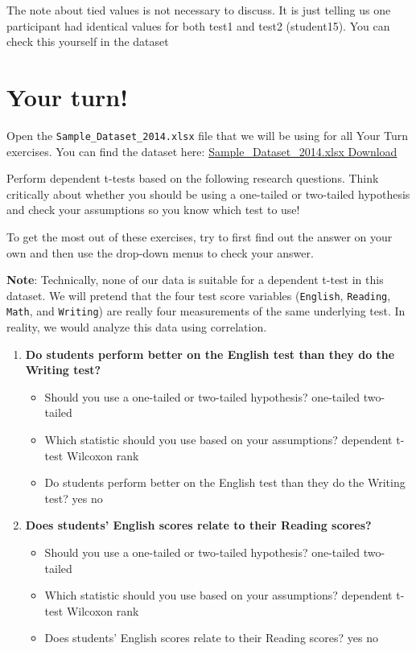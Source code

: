 \documentclass[
]{book}
\begin{document}
The note about tied values is not necessary to discuss. It is just telling us one participant had identical values for both test1 and test2 (student15). You can check this yourself in the dataset

\hypertarget{your-turn-1}{%
\section{Your turn!}\label{your-turn-1}}

Open the \texttt{Sample\_Dataset\_2014.xlsx} file that we will be using for all Your Turn exercises. You can find the dataset here: \href{https://github.com/danawanzer/stats-with-jamovi/blob/master/data/Sample_Dataset_2014.xlsx}{Sample\_Dataset\_2014.xlsx Download}

Perform dependent t-tests based on the following research questions. Think critically about whether you should be using a one-tailed or two-tailed hypothesis and check your assumptions so you know which test to use!

To get the most out of these exercises, try to first find out the answer on your own and then use the drop-down menus to check your answer.

\textbf{Note}: Technically, none of our data is suitable for a dependent t-test in this dataset. We will pretend that the four test score variables (\texttt{English}, \texttt{Reading}, \texttt{Math}, and \texttt{Writing}) are really four measurements of the same underlying test. In reality, we would analyze this data using correlation.

\begin{enumerate}
\def\labelenumi{\arabic{enumi}.}
\item
  \textbf{Do students perform better on the English test than they do the Writing test?}

  \begin{itemize}
  \item
    Should you use a one-tailed or two-tailed hypothesis? one-tailed two-tailed
  \item
    Which statistic should you use based on your assumptions? dependent t-test Wilcoxon rank
  \item
    Do students perform better on the English test than they do the Writing test? yes no
  \end{itemize}
\item
  \textbf{Does students' English scores relate to their Reading scores?}

  \begin{itemize}
  \item
    Should you use a one-tailed or two-tailed hypothesis? one-tailed two-tailed
  \item
    Which statistic should you use based on your assumptions? dependent t-test Wilcoxon rank
  \item
    Does students' English scores relate to their Reading scores? yes no
  \end{itemize}
\end{enumerate}
\end{document}
